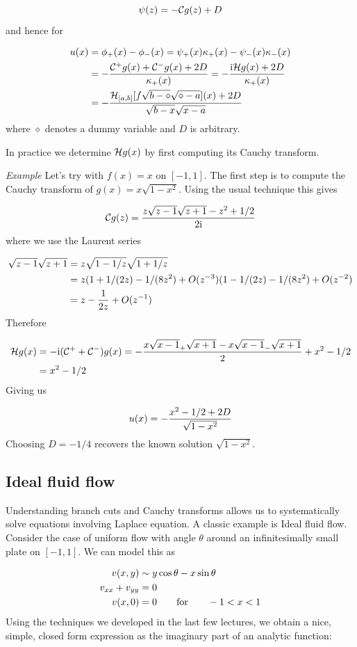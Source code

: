 \documentclass[12pt,a4paper]{article}
\def\qqfor{\qquad\hbox{for}\qquad}
\def\I{ {\rm i} }
\def\CC{ {\cal C} }
\def\HH{ {\cal H} }
\def\qqfor{\qquad\hbox{for}\qquad}
\def\addtab#1={#1\;&=}
\def\ccr{\\\addtab}
\def\addtab#1={#1\;&=}
\def\ccr{\\\addtab}
\begin{document}
\[
\psi(z) = -\CC g(z) + D
\]
and hence for


\begin{align*}
u(x) &= \phi_+(x) - \phi_-(x) = \psi_+(x) \kappa_+(x) - \psi_-(x) \kappa_-(x) \\
&= -{\CC^+ g(x) + \CC^- g(x) + 2 D \over \kappa_+(x)}
= -{\I \HH g(x) + 2D \over \kappa_+(x)}\\
& = -{\HH_{[a,b]}[f \sqrt{b-\diamond}\sqrt{\diamond-a}](x) + 2 D \over \sqrt{b-x} \sqrt{x-a}}
\end{align*}
where $\diamond$ denotes a dummy variable and $D$ is arbitrary.

In practice we determine $\HH g(x)$ by first computing its Cauchy transform.

\emph{Example} Let's try with $f(x) = x$ on $[-1,1]$. The first step is to compute the Cauchy transform of $g(x) = x \sqrt{1-x^2}$.  Using the usual technique this gives

\[
\CC g(z) = {z \sqrt{z-1} \sqrt{z+1} - z^2 +1/2 \over 2 \I}
\]
where we use the Laurent series


\begin{align*}
\sqrt{z-1} \sqrt{z+1} &= z \sqrt{1-1/z} \sqrt{1 + 1/z} \ccr
= z (1+1/(2z) - 1/(8 z^2) + O(z^{-3})(1-1/(2z)  - 1/(8 z^2) + O(z^{-2}) \ccr
= z -{1 \over 2 z} + O(z^{-1})
\end{align*}
Therefore


\begin{align*}
\HH g(x) &= -\I (\CC^+ + \CC^-) g(x) = - {x \sqrt{x-1}_+ \sqrt{x+1} - x \sqrt{x-1}_- \sqrt{x+1} \over 2} + x^2 - 1/2 \ccr
= x^2 - 1/2
\end{align*}
Giving us

\[
u(x) = -{x^2 - 1/2 + 2 D \over \sqrt{1-x^2}}
\]
Choosing $D = -1/4$ recovers the known solution $\sqrt{1-x^2}$.

\subsection{Ideal fluid flow}
Understanding branch cuts and Cauchy transforms allows us to systematically solve equations involving Laplace equation.  A classic example is Ideal fluid flow. Consider the case of uniform flow with angle $\theta$ around an infinitesimally small  plate on $[-1,1]$. We can model this as


\begin{align*}
v(x,y) &\sim y \cos \theta - x \sin \theta  \\
v_{xx} + v_{yy} &= 0 \\
v(x,0) & = 0 \qqfor -1 < x <1
\end{align*}
Using the techniques we developed in the last few lectures, we obtain a nice, simple, closed form expression as the  imaginary part of an analytic function:
\end{document}

